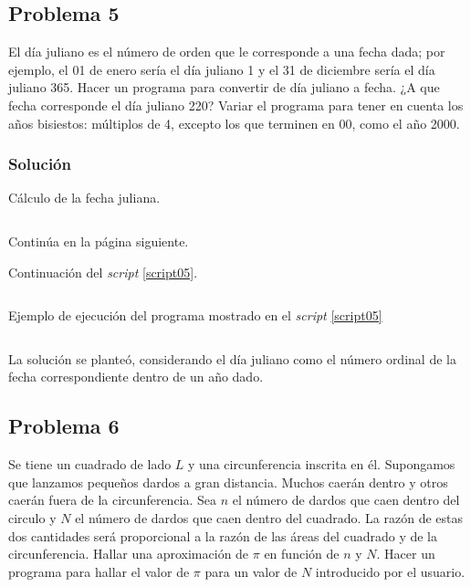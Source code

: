 \documentclass[a4paper,12pt,final]{article}
\begin{document}
  \newpage
  \subsection*{Problema 5}
    \noindent El día juliano es el número de orden que le corresponde a una
    fecha dada; por ejemplo, el 01 de enero sería el día juliano 1 y el 31
    de diciembre sería el día juliano 365. Hacer un programa para
    convertir de día juliano a fecha. ¿A que fecha corresponde el día
    juliano 220? Variar el programa para tener en cuenta los años
    bisiestos: múltiplos de 4, excepto los que terminen en 00, como el
    año 2000.

    \subsubsection*{Solución}
      \begin{listing}[H]
        \caption{Cálculo de la fecha juliana.}
        \label{script05}
        \inputminted[firstline=5,lastline=44]{matlab}{./laboratorio_1/problema05.m}
      \end{listing}
      \vspace{-1em}
      \noindent Continúa en la página siguiente.
      \vspace{\fill}

      \newpage
      \noindent Continuación del \emph{script} \ref{script05}.
      \begin{listing}[H]
        \inputminted[firstline=46]{javascript}{./laboratorio_1/problema05.m}
      \end{listing}

      \begin{listing}[H]
        \caption{Ejemplo de ejecución del programa mostrado en el
        \emph{script} \ref{script05}}
        \label{script05sample}
        \inputminted{text}{./laboratorio_1/problema05_sample.txt}
      \end{listing}

      \noindent La solución se planteó, considerando el día juliano como el
      número ordinal de la fecha correspondiente dentro de un año dado.
      \vspace{\fill}

  \newpage
  \subsection*{Problema 6}
    \noindent Se tiene un cuadrado de lado $L$ y una circunferencia inscrita
    en él. Supongamos que lanzamos pequeños dardos a gran distancia.
    Muchos caerán dentro y otros caerán fuera de la circunferencia. Sea
    $n$ el número de dardos que caen dentro del circulo y $N$ el número
    de dardos que caen dentro del cuadrado. La razón de estas dos
    cantidades será proporcional a la razón de las áreas del cuadrado y de
    la circunferencia. Hallar una aproximación de $\pi$ en función de $n$
    y $N$. Hacer un programa para hallar el valor de $\pi$ para un valor
    de $N$ introducido por el usuario.
\end{document}
